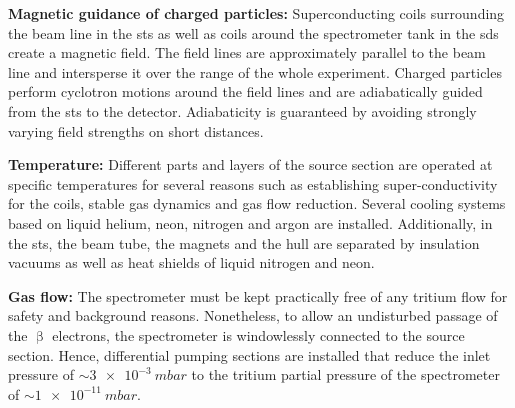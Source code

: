{\par \textbf{Magnetic guidance of charged particles:} Superconducting coils surrounding the beam line in the \gls{sts} as well as coils around the spectrometer tank in the \gls{sds} create a magnetic field. The field lines are approximately parallel to the beam line and intersperse it over the range of the whole experiment. Charged particles perform cyclotron motions around the field lines and are adiabatically guided from the \gls{sts} to the detector. Adiabaticity is guaranteed by avoiding strongly varying field strengths on short distances.}

{\par \textbf{Temperature:} Different parts and layers of the source section are operated at specific temperatures for several reasons such as establishing super-conductivity for the coils, stable gas dynamics and gas flow reduction. Several cooling systems based on liquid helium, neon, nitrogen and argon are installed. Additionally, in the \gls{sts}, the beam tube, the magnets and the hull are separated by insulation vacuums as well as heat shields of liquid nitrogen and neon.}

{\par \textbf{Gas flow:} The spectrometer must be kept practically free of any tritium flow for safety and background reasons. Nonetheless, to allow an undisturbed passage of the $\upbeta$ electrons, the spectrometer is windowlessly connected to the source section. Hence, differential pumping sections are installed that reduce the inlet pressure of $\sim\SI{3e-3}{mbar}$ to the tritium partial pressure of the spectrometer of $\sim\SI{1e-11}{mbar}$.}

